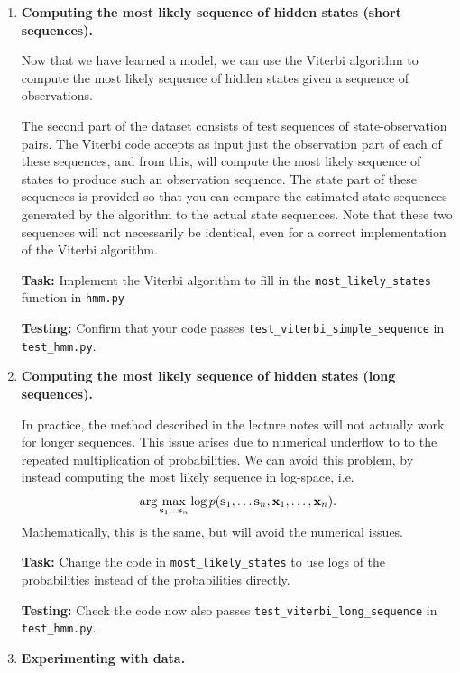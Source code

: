 \documentclass[submit]{harvardml}
\begin{document}
\begin{enumerate}
\item \textbf{Computing the most likely sequence of hidden states (short sequences).}

  Now that we have learned a model, we can use the Viterbi algorithm
  to compute the most likely sequence of hidden states given a
  sequence of observations. 
  
  The second part of the dataset consists of test sequences of
  state-observation pairs.  The Viterbi code accepts as input just the
  observation part of each of these sequences, and from this, will compute
  the most likely sequence of states to produce such an observation
  sequence. The state part of these sequences is provided so that you
  can compare the estimated state sequences generated by the algorithm
  to the actual state sequences.  Note that these two sequences will
  not necessarily be identical, even for a correct implementation of
  the Viterbi algorithm.

  \textbf{Task:}  Implement the Viterbi algorithm to fill in the {\tt most\_likely\_states} function in
{\tt hmm.py}  

  \textbf{Testing:} 
  Confirm that your code 
  passes {\tt test\_viterbi\_simple\_sequence} in  {\tt test\_hmm.py}.

\item \textbf{Computing the most likely sequence of hidden states (long sequences).}
  
  In practice, the method described in the lecture notes will not
  actually work for longer sequences. This issue arises due to
  numerical underflow to to the repeated multiplication of
  probabilities. We can avoid this problem, by instead computing the
  most likely sequence in log-space, i.e.
  \[\arg\max_{\mathbf{s}_{1}\ldots \mathbf{s}_{n}}\log p(\mathbf{s}_1, \ldots
  \mathbf{s}_n, \mathbf{x}_1, \ldots, \mathbf{x}_n).\]
  Mathematically, this is the same, but will avoid the numerical
  issues.
 
 

 \textbf{Task:} Change the code in {\tt most\_likely\_states} to use logs of the probabilities
instead of the probabilities directly.  

\textbf{Testing:} Check the code now also passes {\tt test\_viterbi\_long\_sequence} in  {\tt test\_hmm.py}.

\item   \textbf{Experimenting with data.}


\end{enumerate}
\end{document}
